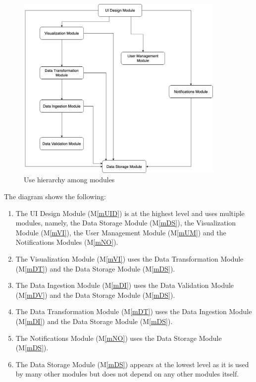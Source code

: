 \documentclass[12pt, titlepage]{article}
\newcommand{\mref}[1]{M\ref{#1}}
\begin{document}
\begin{description}
\begin{description}
\begin{figure}[H]
\centering
\includegraphics[width=0.9\textwidth]{Diagrams/uses hierarchy.png}
\caption{Use hierarchy among modules}
\label{FigUH}
\end{figure}

The diagram shows the following:
\begin{enumerate}
  \item The UI Design Module (\mref{mUID}) is at the highest level and uses multiple modules, 
  namely, the Data Storage Module (\mref{mDS}), the Visualization Module (\mref{mVI}), the User 
  Management Module (\mref{mUM}) and the Notifications Modules (\mref{mNO}).
  \item The Visualization Module (\mref{mVI}) uses the Data Transformation Module (\mref{mDT})
  and the Data Storage Module (\mref{mDS}).
  \item The Data Ingestion Module (\mref{mDI}) uses the Data Validation Module (\mref{mDV}) and 
  the Data Storage Module (\mref{mDS}).
  \item The Data Transformation Module (\mref{mDT}) uses the Data Ingestion Module (\mref{mDI})
  and the Data Storage Module (\mref{mDS}).
  \item The Notifications Module (\mref{mNO}) uses the Data Storage Module (\mref{mDS}).
  \item The Data Storage Module (\mref{mDS}) appears at the lowest level as it is used by many 
  other modules but does not depend on any other modules itself.
\end{enumerate}


\end{description}
\end{description}
\end{document}
